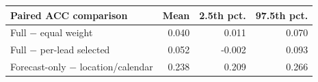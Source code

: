 \begin{tabular}{lrrr}
\toprule
Paired ACC comparison & Mean & 2.5th pct. & 97.5th pct. \\
\midrule
Full $-$ equal weight & 0.040 & 0.011 & 0.070 \\
Full $-$ per-lead selected & 0.052 & -0.002 & 0.093 \\
Forecast-only $-$ location/calendar & 0.238 & 0.209 & 0.266 \\
\bottomrule
\end{tabular}
